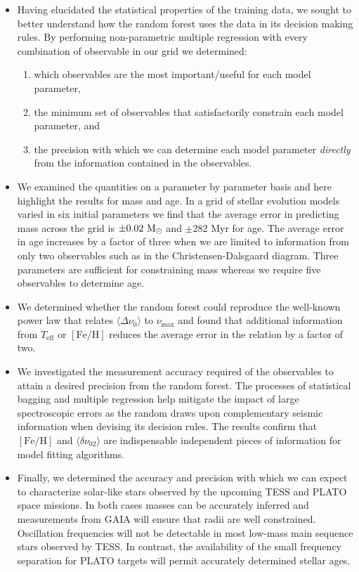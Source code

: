 \begin{itemize}
  
  \item Having elucidated the statistical properties of the training data, we sought to better understand how the random forest uses the data in its decision making rules.
By performing non-parametric multiple regression with every combination of observable in our grid we determined:
\begin{enumerate}
    \item  which observables are the most important/useful for each model parameter,
    \item  the minimum set of observables that satisfactorily constrain each model parameter, and
    \item  the precision with which we can determine each model parameter \emph{directly} from the information contained in the observables. 
\end{enumerate}



\item We examined the quantities on a parameter by parameter basis and here highlight the results for mass and age.  In a grid of stellar evolution models varied in six initial parameters we find that the average error in predicting mass across the grid is ${\pm 0.02 \ \rm{M}_\odot}$ and  ${\pm 282}$ Myr for age. The average error in age increases by a factor of three when we are limited to information from only two observables such as in the Christensen-Dalsgaard diagram. Three parameters are sufficient for constraining mass whereas we require five observables to determine age.  


\item We determined whether the random forest could reproduce the well-known power law that relates ${\langle\Delta\nu_0\rangle}$ to $\nu_{\max}$ and found that additional information from  $T_{\text{eff}}$ or  $[\text{Fe/H}]$ reduces the average error in the relation by a factor of two. 

\item We investigated the measurement accuracy required of the observables to attain a desired precision from the random forest. 
The processes of statistical bagging and multiple regression help mitigate the impact of large spectroscopic errors as the random draws upon complementary seismic information when devising its decision rules. 
The results confirm that $[\text{Fe/H}]$  and  ${\langle\delta\nu_{02}\rangle}$ are indispensable independent pieces of information for model fitting algorithms.

\item Finally, we determined the accuracy and precision with which we can expect to characterize solar-like stars observed by the upcoming TESS and PLATO space missions. In both cases masses can be accurately inferred and measurements from GAIA will ensure that radii are well constrained. Oscillation frequencies will not be detectable in most low-mass main sequence stars observed by TESS. In contrast, the availability of the small frequency separation for PLATO targets will permit accurately determined stellar ages. 
\end{itemize}





